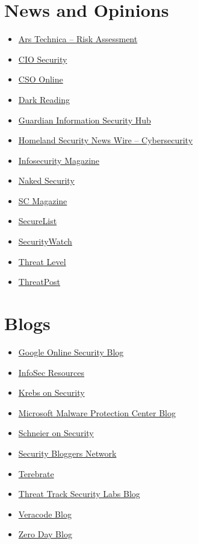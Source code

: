\documentclass[a4paper, 12pt, titlepage]{report}
\begin{document}
\section{News and Opinions}
\begin{multicols}{2}
\begin{itemize}
\item \href{https://arstechnica.com/tag/security/}{Ars Technica – Risk Assessment}
\item \href{https://www.cio.com/category/security/}{CIO Security}
\item \href{https://www.csoonline.com/}{CSO Online}
\item \href{http://www.darkreading.com/}{Dark Reading}
\item \href{https://www.theguardian.com/media-network/information-security}{Guardian Information Security Hub}
\item \href{http://www.homelandsecuritynewswire.com/topics/cybersecurity}{Homeland Security News Wire – Cybersecurity}
\item \href{https://www.infosecurity-magazine.com/}{Infosecurity Magazine}
\item \href{https://nakedsecurity.sophos.com/}{Naked Security}
\item \href{https://www.scmagazine.com/}{SC Magazine}
\item \href{https://securelist.com/}{SecureList}
\item \href{http://securitywatch.pcmag.com/}{SecurityWatch}
\item \href{https://www.wired.com/category/threatlevel/}{Threat Level}
\item \href{https://threatpost.com/}{ThreatPost}
\end{itemize}
\end{multicols}
\section{Blogs}
\begin{multicols}{2}
\begin{itemize}
\item \href{https://security.googleblog.com/}{Google Online Security Blog}
\item \href{https://resources.infosecinstitute.com/}{InfoSec Resources}
\item \href{https://krebsonsecurity.com/}{Krebs on Security}
\item \href{https://www.microsoft.com/security/blog/product/windows/}{Microsoft Malware Protection Center Blog}
\item \href{https://www.schneier.com/}{Schneier on Security}
\item \href{https://securityboulevard.com/feed/}{Security Bloggers Network}
\item \href{https://terebrate.blogspot.com/}{Terebrate}
\item \href{https://blog.threattrack.com/}{Threat Track Security Labs Blog}
\item \href{https://www.veracode.com/blog}{Veracode Blog}
\item \href{https://www.zdnet.com/blog/security/}{Zero Day Blog}
\end{itemize}
\end{multicols}
\end{document}
